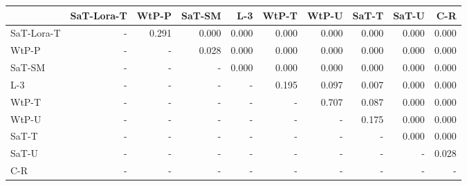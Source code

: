 \begin{tabular}{lrrrrrrrrr}
\toprule
 & SaT-Lora-T & WtP-P & SaT-SM & L-3 & WtP-T & WtP-U & SaT-T & SaT-U & C-R \\
\midrule
SaT-Lora-T & - & 0.291 & 0.000 & 0.000 & 0.000 & 0.000 & 0.000 & 0.000 & 0.000 \\
WtP-P & - & - & 0.028 & 0.000 & 0.000 & 0.000 & 0.000 & 0.000 & 0.000 \\
SaT-SM & - & - & - & 0.000 & 0.000 & 0.000 & 0.000 & 0.000 & 0.000 \\
L-3 & - & - & - & - & 0.195 & 0.097 & 0.007 & 0.000 & 0.000 \\
WtP-T & - & - & - & - & - & 0.707 & 0.087 & 0.000 & 0.000 \\
WtP-U & - & - & - & - & - & - & 0.175 & 0.000 & 0.000 \\
SaT-T & - & - & - & - & - & - & - & 0.000 & 0.000 \\
SaT-U & - & - & - & - & - & - & - & - & 0.028 \\
C-R & - & - & - & - & - & - & - & - & - \\
\bottomrule
\end{tabular}

